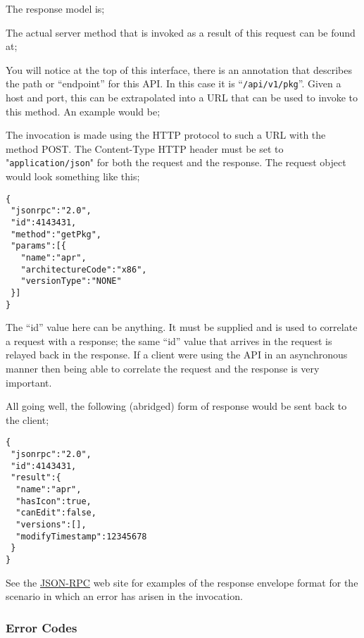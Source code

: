 
The response model is;


The actual server method that is invoked as a result of this request can be found at;


You will notice at the top of this interface, there is an annotation that describes the path or ``endpoint'' for this API.  In this case it is ``{\tt /api/v1/pkg}''.  Given a host and port, this can be extrapolated into a URL that can be used to invoke to this method.  An example would be;


The invocation is made using the HTTP protocol to such a URL with the method POST.  The Content-Type HTTP header must be set to "{\tt application/json}" for both the request and the response.  The request object would look something like this;

\begin{verbatim}
{
 "jsonrpc":"2.0",
 "id":4143431,
 "method":"getPkg",
 "params":[{
   "name":"apr",
   "architectureCode":"x86",
   "versionType":"NONE"
 }]
}
\end{verbatim}

The ``id'' value here can be anything.  It must be supplied and is used to correlate a request with a response; the same ``id'' value that arrives in the request is relayed back in the response.  If a client were using the API in an asynchronous manner then being able to correlate the request and the response is very important.

All going well, the following (abridged) form of response would be sent back to the client;

\begin{verbatim}
{
 "jsonrpc":"2.0",
 "id":4143431,
 "result":{
  "name":"apr",
  "hasIcon":true,
  "canEdit":false,
  "versions":[],
  "modifyTimestamp":12345678
 }
}
\end{verbatim}

See the \href{http://www.jsonrpc.org}{JSON-RPC} web site for examples of the response envelope format for the scenario in which an error has arisen in the invocation.

\subsubsection{Error Codes}

